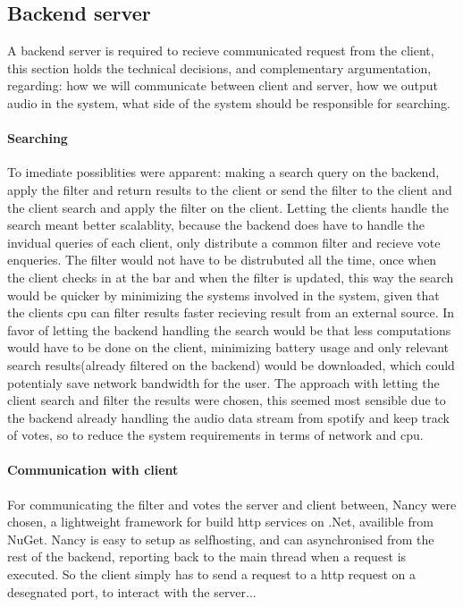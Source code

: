 \subsection{Backend server}

	A backend server is required to recieve communicated request from the client, this section holds the technical decisions, and complementary argumentation, regarding: how we will communicate between client and server, how we output audio in the system, what side of the system should be responsible for searching.

	\paragraph{Searching}
	To imediate possiblities were apparent: making a search query on the backend, apply the filter and return results to the client or send the filter to the client and the client search and apply the filter on the client.
	Letting the clients handle the search meant better scalablity, because the backend does have to handle the invidual queries of each client, only distribute a common filter and recieve vote enqueries. The filter would not have to be distrubuted all the time, once when the client checks in at the bar and when the filter is updated, this way the search would be quicker by minimizing the systems involved in the system, given that the clients cpu can filter results faster recieving result from an external source. In favor of letting the backend handling the search would be that less computations would have to be done on the client, minimizing battery usage and only relevant search results(already filtered on the backend) would be downloaded, which could potentialy save network bandwidth for the user. The approach with letting the client search and filter the results were chosen, this seemed most sensible due to the backend already handling the audio data stream from spotify and keep track of votes, so to reduce the system requirements in terms of network and cpu.

	\paragraph{Communication with client}
	For communicating the filter and votes the server and client between, Nancy \cite{nancy} were chosen, a lightweight framework for build http services on .Net, availible from NuGet. Nancy is easy to setup as selfhosting, and can asynchronised from the rest of the backend, reporting back to the main thread when a request is executed. So the client simply has to send a request to a http request on a desegnated port, to interact with the server...  

